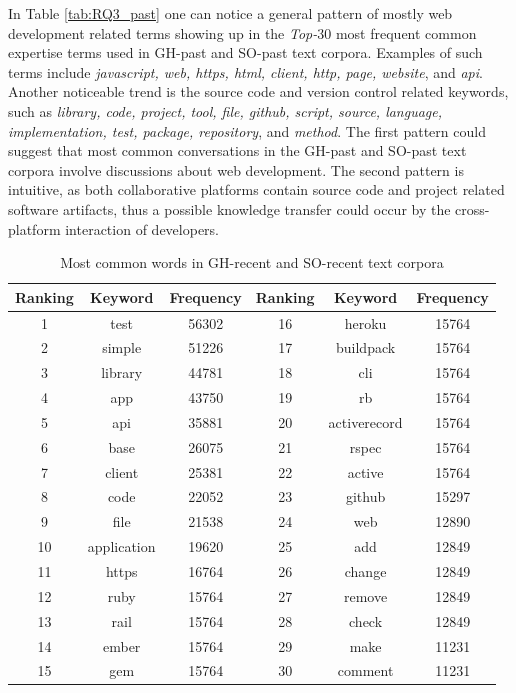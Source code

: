         In Table \ref{tab:RQ3_past} one can notice a general pattern of mostly web development related terms showing up in the \emph{Top-$30$} most frequent common expertise terms used in GH-past and SO-past text corpora. Examples of such terms include \emph{javascript, web, https, html, client, http, page, website}, and \emph{api}. Another noticeable trend is the source code and version control related keywords, such as \emph{library, code, project, tool, file, github, script, source, language, implementation, test, package, repository}, and \emph{method}. The first pattern could suggest that most common conversations in the GH-past and SO-past text corpora involve discussions about web development. The second pattern is intuitive, as both collaborative platforms contain source code and project related software artifacts, thus a possible knowledge transfer could occur by the cross-platform interaction of developers. 
        
        \begin{table}
          \centering
          \caption{Most common words in GH-recent and SO-recent text corpora}\label{tab:RQ3_recent}
            \vspace{6pt} %
          \begin{tabular}{|c c c | c c c|}
            \hline
            Ranking & Keyword & Frequency & Ranking & Keyword & Frequency \\
            \hline\hline
            1 & test & 56302 & 16 & heroku & 15764 \\
            2 & simple & 51226 & 17 & buildpack & 15764 \\
            3 & library & 44781 & 18 & cli & 15764 \\
            4 & app & 43750 & 19 & rb & 15764 \\
            5 & api & 35881 & 20 & activerecord & 15764 \\
            6 & base & 26075 & 21 & rspec & 15764 \\
            7 & client & 25381 & 22 & active & 15764 \\
            8 & code & 22052 & 23 & github & 15297 \\
            9 & file & 21538 & 24 & web & 12890 \\
            10 & application & 19620 & 25 & add & 12849 \\
            11 & https & 16764 & 26 & change & 12849\\
            12 & ruby & 15764  & 27 & remove & 12849 \\
            13 & rail & 15764 & 28 & check & 12849\\
            14 & ember & 15764 & 29 & make & 11231 \\
            15 & gem & 15764 & 30 & comment & 11231\\
            \hline
          \end{tabular}
        \end{table}
        
